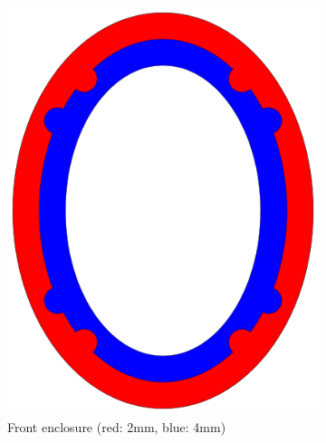 \documentclass{article}
\begin{document}
\begin{figure}[htb]
\begin{subfigure}[b]{0.24\textwidth}
        \includegraphics[width=\textwidth]{images/encasing_front_height_map.png}
        \caption{Front enclosure (red: 2mm, blue: 4mm)}
        \label{f:enclosure:front}
    \end{subfigure}
    \begin{subfigure}[b]{0.24\textwidth}

\end{subfigure}
\end{figure}
\end{document}
